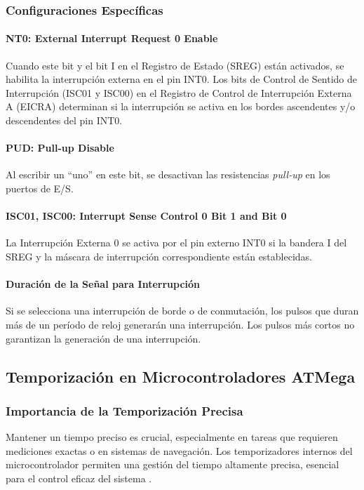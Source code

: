 \subsubsection{Configuraciones Específicas}

\paragraph{NT0: External Interrupt Request 0 Enable}
Cuando este bit y el bit I en el Registro de Estado (SREG) están activados, se habilita la interrupción externa en el pin INT0. Los bits de Control de Sentido de Interrupción (ISC01 y ISC00) en el Registro de Control de Interrupción Externa A (EICRA) determinan si la interrupción se activa en los bordes ascendentes y/o descendentes del pin INT0.

\paragraph{PUD: Pull-up Disable}
Al escribir un ``uno'' en este bit, se desactivan las resistencias \textit{pull-up} en los puertos de E/S.

\paragraph{ISC01, ISC00: Interrupt Sense Control 0 Bit 1 and Bit 0}
La Interrupción Externa 0 se activa por el pin externo INT0 si la bandera I del SREG y la máscara de interrupción correspondiente están establecidas.

\paragraph{Duración de la Señal para Interrupción}
Si se selecciona una interrupción de borde o de conmutación, los pulsos que duran más de un período de reloj generarán una interrupción. Los pulsos más cortos no garantizan la generación de una interrupción.

\subsection{Temporización en Microcontroladores ATMega}

\subsubsection{Importancia de la Temporización Precisa}

Mantener un tiempo preciso es crucial, especialmente en tareas que requieren mediciones exactas o en sistemas de navegación. Los temporizadores internos del microcontrolador permiten una gestión del tiempo altamente precisa, esencial para el control eficaz del sistema \cite{Alley2011}.

